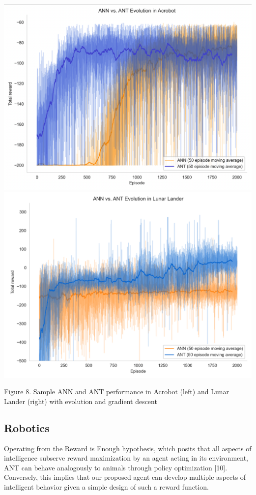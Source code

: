 \documentclass{article}
\begin{document}
\begin{multicols}{2}
	\begin{center}
		\includegraphics[scale=0.1]{figs/ann_ant_acrobot_evolution.png}
		\includegraphics[scale=0.21]{figs/ann_ant_lunarlander_evolution.png}
		
		\small Figure 8. Sample ANN and ANT performance in Acrobot (left) and Lunar Lander (right) with evolution and gradient descent
	\end{center}
	
	\subsection{Robotics}
	
	Operating from the Reward is Enough hypothesis, which posits that all aspects of intelligence subserve reward maximization by an agent acting in its environment, ANT can behave analogously to animals through policy optimization [10]. Conversely, this implies that our proposed agent can develop multiple aspects of intelligent behavior given a simple design of such a reward function.
	

\end{multicols}
\end{document}

